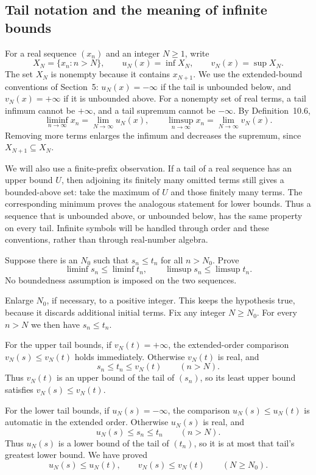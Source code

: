 \subsection*{Tail notation and the meaning of infinite bounds}
For a real sequence $(x_n)$ and an integer $N\ge1$, write
\[
 X_N=\{x_n:n>N\},\qquad
 u_N(x)=\inf X_N,\qquad v_N(x)=\sup X_N.
\]
The set $X_N$ is nonempty because it contains $x_{N+1}$. We use the
extended-bound conventions of Section~5: $u_N(x)=-\infty$ if the
tail is unbounded below, and $v_N(x)=+\infty$ if it is unbounded
above. For a nonempty set of real terms, a tail infimum cannot be
$+\infty$, and a tail supremum cannot be $-\infty$.
By Definition~10.6,
\[
 \liminf_{n\to\infty}x_n=\lim_{N\to\infty}u_N(x),\qquad
 \limsup_{n\to\infty}x_n=\lim_{N\to\infty}v_N(x).
\]
Removing more terms enlarges the infimum and decreases the supremum,
since $X_{N+1}\subseteq X_N$.

We will also use a finite-prefix observation. If a tail of a real
sequence has an upper bound $U$, then adjoining its finitely many
omitted terms still gives a bounded-above set: take the maximum of
$U$ and those finitely many terms. The corresponding minimum proves
the analogous statement for lower bounds. Thus a sequence that is
unbounded above, or unbounded below, has the same property on every
tail. Infinite symbols will be handled through order and these
conventions, rather than through real-number algebra.


\goal Suppose there is an $N_0$ such that $s_n\le t_n$ for all
$n>N_0$. Prove
\[
 \liminf s_n\le\liminf t_n,
 \qquad
 \limsup s_n\le\limsup t_n.
\]
No boundedness assumption is imposed on the two sequences.

Enlarge $N_0$, if necessary, to a positive integer. This keeps the
hypothesis true, because it discards additional initial terms.
Fix any integer $N\ge N_0$. For every $n>N$ we then have
$s_n\le t_n$.

For the upper tail bounds, if $v_N(t)=+\infty$, the extended-order
comparison $v_N(s)\le v_N(t)$ holds immediately. Otherwise $v_N(t)$
is real, and
\[
 s_n\le t_n\le v_N(t)\qquad(n>N).
\]
Thus $v_N(t)$ is an upper bound of the tail of $(s_n)$, so its least
upper bound satisfies $v_N(s)\le v_N(t)$.

For the lower tail bounds, if $u_N(s)=-\infty$, the comparison
$u_N(s)\le u_N(t)$ is automatic in the extended order.
Otherwise $u_N(s)$ is real, and
\[
 u_N(s)\le s_n\le t_n\qquad(n>N).
\]
Thus $u_N(s)$ is a lower bound of the tail of $(t_n)$, so it is at
most that tail's greatest lower bound. We have proved
\[
 u_N(s)\le u_N(t),\qquad v_N(s)\le v_N(t)
 \qquad(N\ge N_0).
\]

